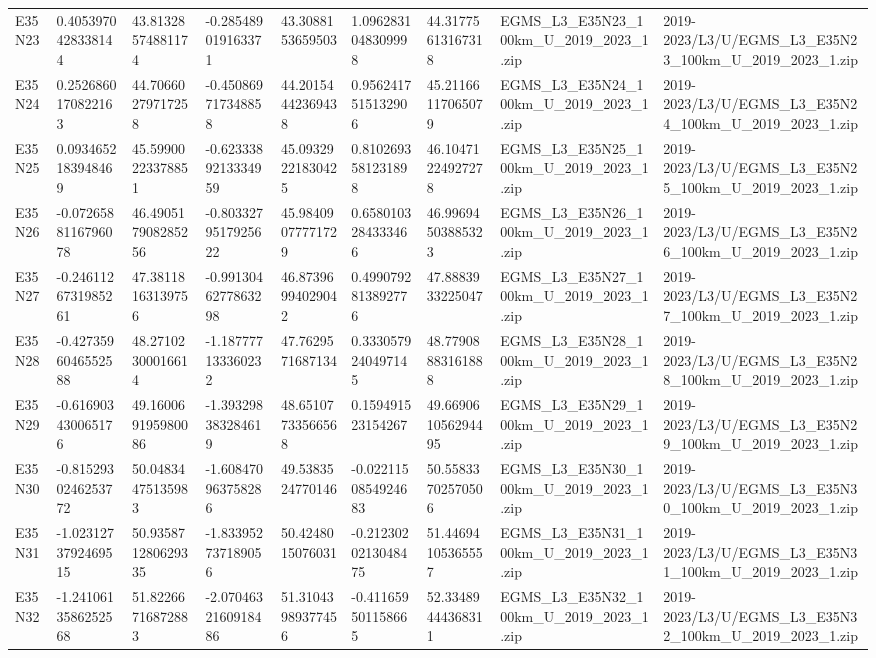 \begin{landscape}
\begin{longtable}{lllllllll}
E35N23 & 0.4053970428338144 & 43.81328574881174 & -0.285489019163371 & 43.3088153659503 & 1.0962831048309998 & 44.31775613167318 & EGMS\_L3\_E35N23\_100km\_U\_2019\_2023\_1.zip & 2019-2023/L3/U/EGMS\_L3\_E35N23\_100km\_U\_2019\_2023\_1.zip \\
E35N24 & 0.2526860170822163 & 44.70660279717258 & -0.450869717348858 & 44.20154442369438 & 0.9562417515132906 & 45.21166117065079 & EGMS\_L3\_E35N24\_100km\_U\_2019\_2023\_1.zip & 2019-2023/L3/U/EGMS\_L3\_E35N24\_100km\_U\_2019\_2023\_1.zip \\
E35N25 & 0.0934652183948469 & 45.59900223378851 & -0.6233389213334959 & 45.09329221830425 & 0.8102693581231898 & 46.10471224927278 & EGMS\_L3\_E35N25\_100km\_U\_2019\_2023\_1.zip & 2019-2023/L3/U/EGMS\_L3\_E35N25\_100km\_U\_2019\_2023\_1.zip \\
E35N26 & -0.0726588116796078 & 46.490517908285256 & -0.8033279517925622 & 45.98409077771729 & 0.6580103284333466 & 46.99694503885323 & EGMS\_L3\_E35N26\_100km\_U\_2019\_2023\_1.zip & 2019-2023/L3/U/EGMS\_L3\_E35N26\_100km\_U\_2019\_2023\_1.zip \\
E35N27 & -0.2461126731985261 & 47.38118163139756 & -0.9913046277863298 & 46.87396994029042 & 0.4990792813892776 & 47.8883933225047 & EGMS\_L3\_E35N27\_100km\_U\_2019\_2023\_1.zip & 2019-2023/L3/U/EGMS\_L3\_E35N27\_100km\_U\_2019\_2023\_1.zip \\
E35N28 & -0.4273596046552588 & 48.27102300016614 & -1.187777133360232 & 47.7629571687134 & 0.3330579240497145 & 48.77908883161888 & EGMS\_L3\_E35N28\_100km\_U\_2019\_2023\_1.zip & 2019-2023/L3/U/EGMS\_L3\_E35N28\_100km\_U\_2019\_2023\_1.zip \\
E35N29 & -0.616903430065176 & 49.160069195980086 & -1.393298383284619 & 48.65107733566568 & 0.159491523154267 & 49.669061056294495 & EGMS\_L3\_E35N29\_100km\_U\_2019\_2023\_1.zip & 2019-2023/L3/U/EGMS\_L3\_E35N29\_100km\_U\_2019\_2023\_1.zip \\
E35N30 & -0.8152930246253772 & 50.04834475135983 & -1.608470963758286 & 49.5383524770146 & -0.0221150854924683 & 50.55833702570506 & EGMS\_L3\_E35N30\_100km\_U\_2019\_2023\_1.zip & 2019-2023/L3/U/EGMS\_L3\_E35N30\_100km\_U\_2019\_2023\_1.zip \\
E35N31 & -1.0231273792469515 & 50.935871280629335 & -1.833952737189056 & 50.4248015076031 & -0.2123020213048475 & 51.44694105365557 & EGMS\_L3\_E35N31\_100km\_U\_2019\_2023\_1.zip & 2019-2023/L3/U/EGMS\_L3\_E35N31\_100km\_U\_2019\_2023\_1.zip \\
E35N32 & -1.2410613586252568 & 51.82266716872883 & -2.0704632160918486 & 51.31043989377456 & -0.411659501158665 & 52.33489444368311 & EGMS\_L3\_E35N32\_100km\_U\_2019\_2023\_1.zip & 2019-2023/L3/U/EGMS\_L3\_E35N32\_100km\_U\_2019\_2023\_1.zip \\

\end{longtable}
\end{landscape}
